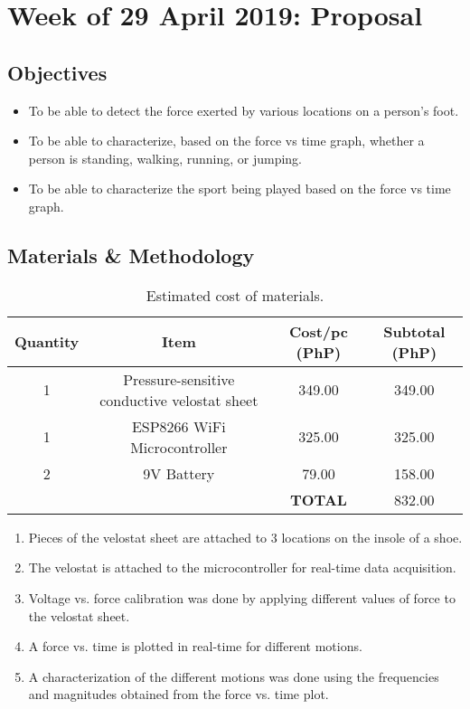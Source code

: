 \documentclass[12pt,a4paper]{article}
\begin{document}
\clearpage

\section*{Week of 29 April 2019: Proposal}
\medskip

\subsection*{Objectives}
\begin{itemize}
	\item To be able to detect the force exerted by various locations on a person's foot.
	\item To be able to characterize, based on the force vs time graph, whether a person is standing, walking, running, or jumping.
	\item To be able to characterize the sport being played based on the force vs time graph.
\end{itemize}

\subsection*{Materials \& Methodology}

\begin{table}[h!]
	\centering
	\caption{Estimated cost of materials.}
	\begin{tabular}{cccc}
	Quantity & Item & Cost/pc (PhP) & Subtotal (PhP) \\ \hline
	1 & Pressure-sensitive conductive velostat sheet & 349.00 & 349.00 \\
	1 & ESP8266 WiFi Microcontroller & 325.00 & 325.00 \\
	2 & 9V Battery & 79.00 & 158.00 \\
	& & \textbf{TOTAL} & 832.00
	\end{tabular}
\end{table}

\begin{enumerate}
	\item Pieces of the velostat sheet are attached to 3 locations on the insole of a shoe. 
	\item The velostat is attached to the microcontroller for real-time data acquisition.
	\item Voltage vs. force calibration was done by applying different values of force to the velostat sheet.
	\item A force vs. time is plotted in real-time for different motions.
	\item A characterization of the different motions was done using the frequencies and magnitudes obtained from the force vs. time plot.
\end{enumerate}
\end{document}
